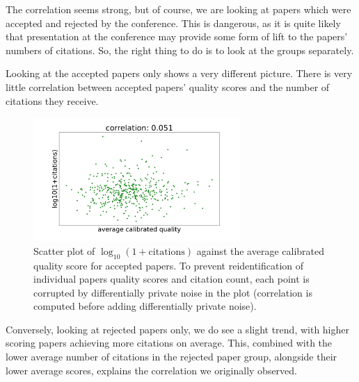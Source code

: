 The correlation seems strong, but of course, we are looking at papers
which were accepted and rejected by the conference. This is dangerous,
as it is quite likely that presentation at the conference may provide
some form of lift to the papers' numbers of citations. So, the right
thing to do is to look at the groups separately.

Looking at the accepted papers only shows a very different picture.
There is very little correlation between accepted papers' quality scores
and the number of citations they receive.

\begin{figure}[htb]
\includegraphics[width=0.70\textwidth]{diagrams/neurips/citations-vs-average-calibrated-quality-accept.pdf}


\caption{Scatter plot of $\log_{10}(1+\text{citations})$ against the average calibrated quality score for accepted papers. To prevent reidentification of individual papers quality scores and citation count, each point is corrupted by differentially private noise in the plot (correlation is computed before adding differentially private noise).}
\label{citations-vs-average-calibrated-quality-accept}
\end{figure}

Conversely, looking at rejected papers only, we do see a slight trend,
with higher scoring papers achieving more citations on average. This,
combined with the lower average number of citations in the rejected
paper group, alongside their lower average scores, explains the
correlation we originally observed.

